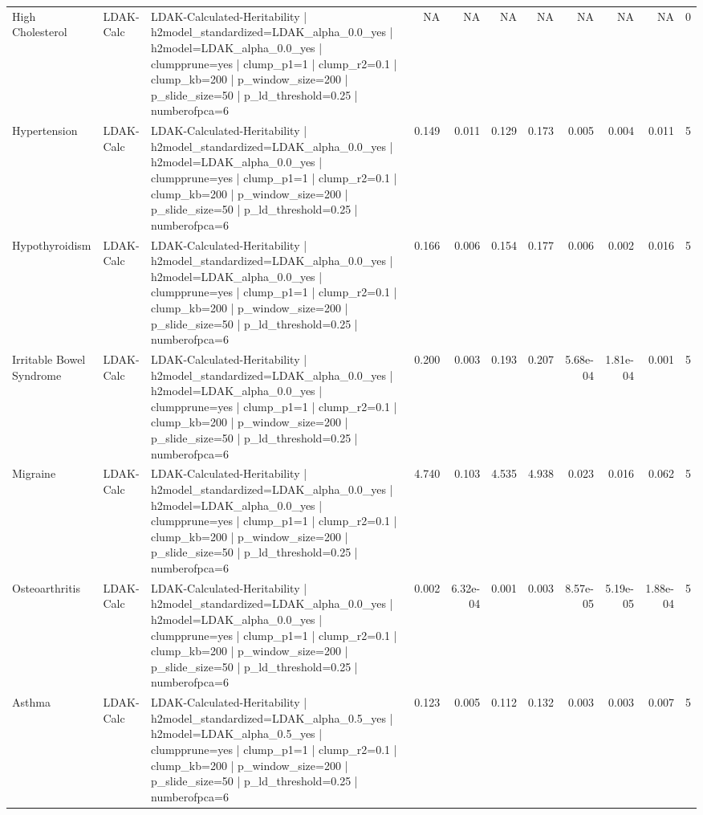 \begin{landscape}
\begin{longtable}{p{2.4cm}p{1.8cm}p{6.0cm}rrrrrrrr}
High Cholesterol & LDAK-Calc & LDAK-Calculated-Heritability | h2model\_standardized=LDAK\_alpha\_0.0\_yes | h2model=LDAK\_alpha\_0.0\_yes | clumpprune=yes | clump\_p1=1 | clump\_r2=0.1 | clump\_kb=200 | p\_window\_size=200 | p\_slide\_size=50 | p\_ld\_threshold=0.25 | numberofpca=6 & NA & NA & NA & NA & NA & NA & NA & 0 \\
Hypertension & LDAK-Calc & LDAK-Calculated-Heritability | h2model\_standardized=LDAK\_alpha\_0.0\_yes | h2model=LDAK\_alpha\_0.0\_yes | clumpprune=yes | clump\_p1=1 | clump\_r2=0.1 | clump\_kb=200 | p\_window\_size=200 | p\_slide\_size=50 | p\_ld\_threshold=0.25 | numberofpca=6 & 0.149 & 0.011 & 0.129 & 0.173 & 0.005 & 0.004 & 0.011 & 5 \\
Hypothyroidism & LDAK-Calc & LDAK-Calculated-Heritability | h2model\_standardized=LDAK\_alpha\_0.0\_yes | h2model=LDAK\_alpha\_0.0\_yes | clumpprune=yes | clump\_p1=1 | clump\_r2=0.1 | clump\_kb=200 | p\_window\_size=200 | p\_slide\_size=50 | p\_ld\_threshold=0.25 | numberofpca=6 & 0.166 & 0.006 & 0.154 & 0.177 & 0.006 & 0.002 & 0.016 & 5 \\
Irritable Bowel Syndrome & LDAK-Calc & LDAK-Calculated-Heritability | h2model\_standardized=LDAK\_alpha\_0.0\_yes | h2model=LDAK\_alpha\_0.0\_yes | clumpprune=yes | clump\_p1=1 | clump\_r2=0.1 | clump\_kb=200 | p\_window\_size=200 | p\_slide\_size=50 | p\_ld\_threshold=0.25 | numberofpca=6 & 0.200 & 0.003 & 0.193 & 0.207 & 5.68e-04 & 1.81e-04 & 0.001 & 5 \\
Migraine & LDAK-Calc & LDAK-Calculated-Heritability | h2model\_standardized=LDAK\_alpha\_0.0\_yes | h2model=LDAK\_alpha\_0.0\_yes | clumpprune=yes | clump\_p1=1 | clump\_r2=0.1 | clump\_kb=200 | p\_window\_size=200 | p\_slide\_size=50 | p\_ld\_threshold=0.25 | numberofpca=6 & 4.740 & 0.103 & 4.535 & 4.938 & 0.023 & 0.016 & 0.062 & 5 \\
Osteoarthritis & LDAK-Calc & LDAK-Calculated-Heritability | h2model\_standardized=LDAK\_alpha\_0.0\_yes | h2model=LDAK\_alpha\_0.0\_yes | clumpprune=yes | clump\_p1=1 | clump\_r2=0.1 | clump\_kb=200 | p\_window\_size=200 | p\_slide\_size=50 | p\_ld\_threshold=0.25 | numberofpca=6 & 0.002 & 6.32e-04 & 0.001 & 0.003 & 8.57e-05 & 5.19e-05 & 1.88e-04 & 5 \\
Asthma & LDAK-Calc & LDAK-Calculated-Heritability | h2model\_standardized=LDAK\_alpha\_0.5\_yes | h2model=LDAK\_alpha\_0.5\_yes | clumpprune=yes | clump\_p1=1 | clump\_r2=0.1 | clump\_kb=200 | p\_window\_size=200 | p\_slide\_size=50 | p\_ld\_threshold=0.25 | numberofpca=6 & 0.123 & 0.005 & 0.112 & 0.132 & 0.003 & 0.003 & 0.007 & 5 \\

\end{longtable}
\end{landscape}
